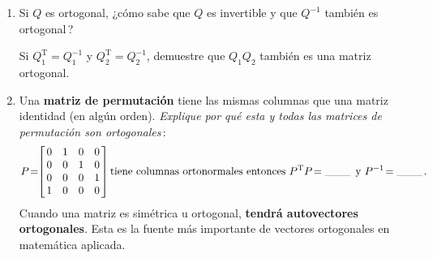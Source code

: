 \documentclass[12pt,a4paper]{article}
\newcommand\1{\mbox{\,\vrule height-0.8pt depth1.0pt width2pc\,}}
\newcommand\2{\mbox{\,\vrule height-0.8pt depth1.0pt width1pc\,}}
\DeclareRobustCommand\transp{^{\mathrm{T}}}
\begin{document}
\begin{enumerate}
\item Si $Q$ es ortogonal, ¿cómo sabe que $Q$ es invertible y que $Q^{-1}$ también es ortogonal\,?

Si $Q_1\transp=Q_1^{-1}$ y $Q_2\transp=Q_2^{-1}$, demuestre que $Q_1Q_2$ también es una matriz ortogonal.

\item Una \textbf{matriz de permutación} tiene las mismas columnas que una matriz identidad (en algún orden). %
\emph{Explique por qué esta y todas las matrices de permutación son ortogonales}\,:\linebreak\vspace{-4pt}
%
$$
P\!=\!\!\left[\begin{array}{@{\,}rrrr@{\,}}0&1&0&0\\0&0&1&0\\0&0&0&1\\1&0&0&0\\\end{array}\right] \text{tiene columnas ortonormales entonces } P\transp P\!=\!\1\text{ y } P^{-1}\!=\!\1.
$$
%
Cuando una matriz es simétrica u ortogonal, \textbf{tendrá autovectores ortogonales}. %
Esta es la fuente más importante de vectores ortogonales en matemática aplicada. %


\end{enumerate}
\end{document}
